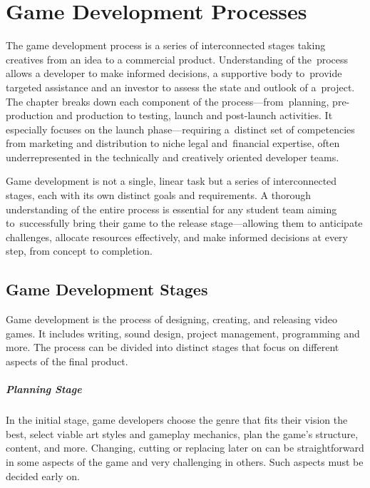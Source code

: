 \chapter{Game Development Processes}

\begin{chapterabstract}
	The game development process is a series of interconnected stages taking creatives from an idea to a commercial product. Understanding of the~process allows a developer to make informed decisions, a supportive body to~provide targeted assistance and an investor to assess the state and outlook of a~project. The chapter breaks down each component of the process---from~planning, pre-production and production to testing, launch and post-launch activities. It especially focuses on the launch phase---requiring a~distinct set of competencies from marketing and distribution to niche legal and~financial expertise, often underrepresented in the technically and creatively oriented developer teams.
\end{chapterabstract}

Game development is not a single, linear task but a series of interconnected stages, each with its own distinct goals and requirements. A thorough understanding of the entire process is essential for any student team aiming to~successfully bring their game to the release stage---allowing them to anticipate challenges, allocate resources effectively, and make informed decisions at every step, from concept to completion.

\section{Game Development Stages}
Game development is the process of designing, creating, and releasing video games. It includes writing, sound design, project management, programming and more. The process can be divided into distinct stages that focus on different aspects of the final product.
\cite{bramble_7-stages, rocket_6-stages}

\paragraph{Planning Stage}
In the initial stage, game developers choose the genre that fits their vision the best, select viable art styles and gameplay mechanics, plan the game’s structure, content, and more. Changing, cutting or replacing later on can be straightforward in some aspects of the game and very challenging in others. Such aspects must be decided early on.
\cite{bramble_7-stages, rocket_6-stages}

